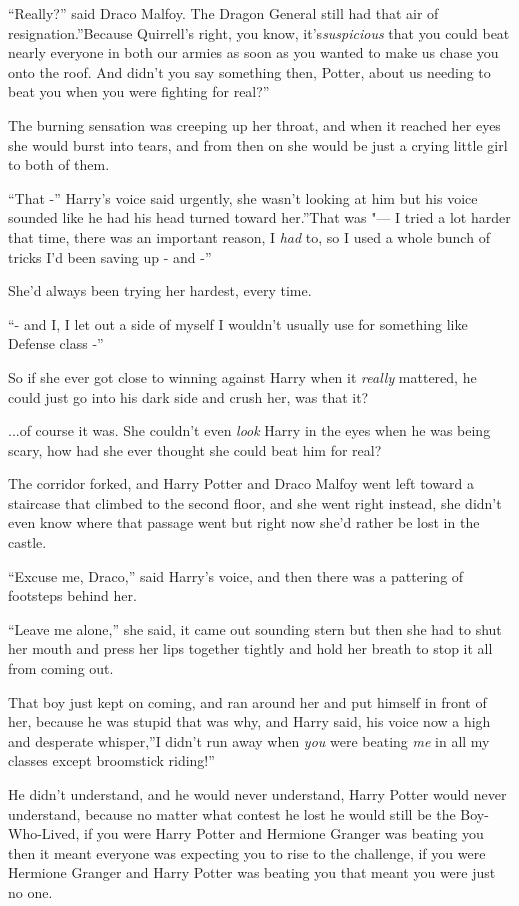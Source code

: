 ``Really?'' said Draco Malfoy. The Dragon General still had that air of
resignation.''Because Quirrell's right, you know, it's\emph{suspicious}
that you could beat nearly everyone in both our armies as soon as you
wanted to make us chase you onto the roof. And didn't you say something
then, Potter, about us needing to beat you when you were fighting for
real?''

The burning sensation was creeping up her throat, and when it reached
her eyes she would burst into tears, and from then on she would be just
a crying little girl to both of them.

``That -'' Harry's voice said urgently, she wasn't looking at him but
his voice sounded like he had his head turned toward her.''That was "--- I
tried a lot harder that time, there was an important reason, I
\emph{had} to, so I used a whole bunch of tricks I'd been saving up -
and -''

She'd always been trying her hardest, every time.

``- and I, I let out a side of myself I wouldn't usually use for
something like Defense class -''

So if she ever got close to winning against Harry when it \emph{really}
mattered, he could just go into his dark side and crush her, was that
it?

...of course it was. She couldn't even \emph{look} Harry in the
eyes when he was being scary, how had she ever thought she could beat
him for real?

The corridor forked, and Harry Potter and Draco Malfoy went left toward
a staircase that climbed to the second floor, and she went right
instead, she didn't even know where that passage went but right now
she'd rather be lost in the castle.

``Excuse me, Draco,'' said Harry's voice, and then there was a pattering
of footsteps behind her.

``Leave me alone,'' she said, it came out sounding stern but then she
had to shut her mouth and press her lips together tightly and hold her
breath to stop it all from coming out.

That boy just kept on coming, and ran around her and put himself in
front of her, because he was stupid that was why, and Harry said, his
voice now a high and desperate whisper,''I didn't run away when
\emph{you} were beating \emph{me} in all my classes except broomstick
riding!''

He didn't understand, and he would never understand, Harry Potter would
never understand, because no matter what contest he lost he would still
be the Boy-Who-Lived, if you were Harry Potter and Hermione Granger was
beating you then it meant everyone was expecting you to rise to the
challenge, if you were Hermione Granger and Harry Potter was beating you
that meant you were just no one.

